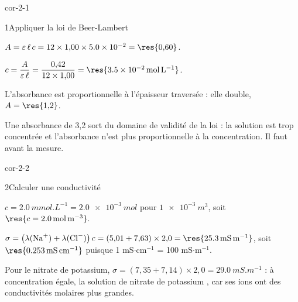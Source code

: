 \corrigesSouples

\begin{blocLivre}{cor-2-1}
\begin{corrige}{1}{Appliquer la loi de Beer-Lambert}
\begin{questions}
\item $A=\varepsilon\,\ell\,c=12\times1{,}00\times\num{5.0e-2}=\res{0{,}60}$.
\item $c=\dfrac{A}{\varepsilon\,\ell}=\dfrac{0{,}42}{12\times1{,}00}=\res{\qty{3,5e-2}{mol.L^{-1}}}$.
\item L'absorbance est proportionnelle à l'épaisseur traversée : elle double, $A=\res{1{,}2}$.
\item Une absorbance de 3,2 sort du domaine de validité de la loi : la solution est trop concentrée et
l'absorbance n'est plus proportionnelle à la concentration. Il faut  avant la mesure.
\end{questions}
\end{corrige}
\end{blocLivre}
\begin{blocLivre}{cor-2-2}
\begin{corrige}{2}{Calculer une conductivité}
\begin{questions}
\item $c=\qty{2,0}{mmol.L^{-1}}=\qty{2,0e-3}{mol}$ pour $\qty{1e-3}{m^3}$, soit $\res{c=\qty{2,0}{mol.m^{-3}}}$.
\item $\sigma=\left(\lambda(\ce{Na+})+\lambda(\ce{Cl-})\right)c=(5{,}01+7{,}63)\times2{,}0=\res{\qty{25,3}{mS.m^{-1}}}$,
soit $\res{\qty{0,253}{mS.cm^{-1}}}$ puisque 1 mS$\cdot$cm$^{-1}$ = 100 mS$\cdot$m$^{-1}$.
\item Pour le nitrate de potassium, $\sigma=(7{,}35+7{,}14)\times2{,}0=\qty{29,0}{mS.m^{-1}}$ : à concentration égale,
la solution de nitrate de potassium , car ses ions ont des conductivités molaires plus grandes.
\end{questions}
\end{corrige}
\end{blocLivre}
